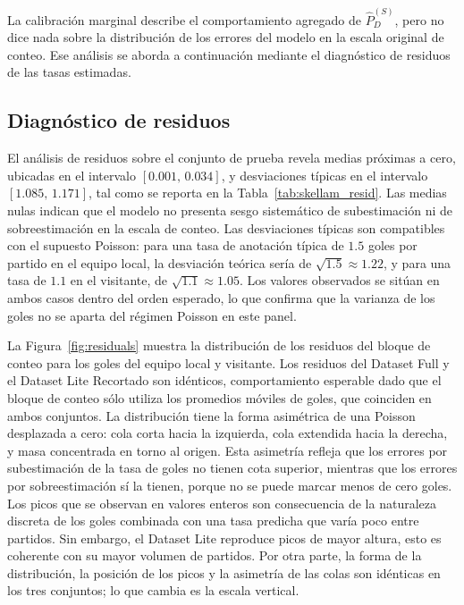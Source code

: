 La calibraci\'on marginal describe el comportamiento agregado de $\hat{P}_D^{(S)}$, pero no dice nada sobre la distribuci\'on de los errores del modelo en la escala original de conteo. Ese an\'alisis se aborda a continuaci\'on mediante el diagn\'ostico de residuos de las tasas estimadas.

\subsection{Diagn\'ostico de residuos}
\label{subsec:res_residuos}

El an\'alisis de residuos sobre el conjunto de prueba revela medias pr\'oximas a cero, ubicadas en el intervalo $[0{.}001,\,0{.}034]$, y desviaciones t\'ipicas en el intervalo $[1{.}085,\,1{.}171]$, tal como se reporta en la Tabla~\ref{tab:skellam_resid}. Las medias nulas indican que el modelo no presenta sesgo sistem\'atico de subestimaci\'on ni de sobreestimaci\'on en la escala de conteo. Las desviaciones t\'ipicas son compatibles con el supuesto Poisson: para una tasa de anotaci\'on t\'ipica de $1{.}5$ goles por partido en el equipo local, la desviaci\'on te\'orica ser\'ia de $\sqrt{1{.}5}\approx 1{.}22$, y para una tasa de $1{.}1$ en el visitante, de $\sqrt{1{.}1}\approx 1{.}05$. Los valores observados se sit\'uan en ambos casos dentro del orden esperado, lo que confirma que la varianza de los goles no se aparta del r\'egimen Poisson en este panel.



La Figura~\ref{fig:residuals} muestra la distribuci\'on de los residuos del bloque de conteo para los goles del equipo local y visitante. Los residuos del Dataset Full y el Dataset Lite Recortado son id\'enticos, comportamiento esperable dado que el bloque de conteo s\'olo utiliza los promedios m\'oviles de goles, que coinciden en ambos conjuntos. La distribuci\'on tiene la forma asim\'etrica de una Poisson desplazada a cero: cola corta hacia la izquierda, cola extendida hacia la derecha, y masa concentrada en torno al origen. Esta asimetr\'ia refleja que los errores por subestimaci\'on de la tasa de goles no tienen cota superior, mientras que los errores por sobreestimaci\'on s\'i la tienen, porque no se puede marcar menos de cero goles. Los picos que se observan en valores enteros son consecuencia de la naturaleza discreta de los goles combinada con una tasa predicha que var\'ia poco entre partidos. Sin embargo, el Dataset Lite reproduce picos de mayor altura, esto es coherente con su mayor volumen de partidos. Por otra parte, la forma de la distribuci\'on, la posici\'on de los picos y la asimetr\'ia de las colas son id\'enticas en los tres conjuntos; lo que cambia es la escala vertical.

